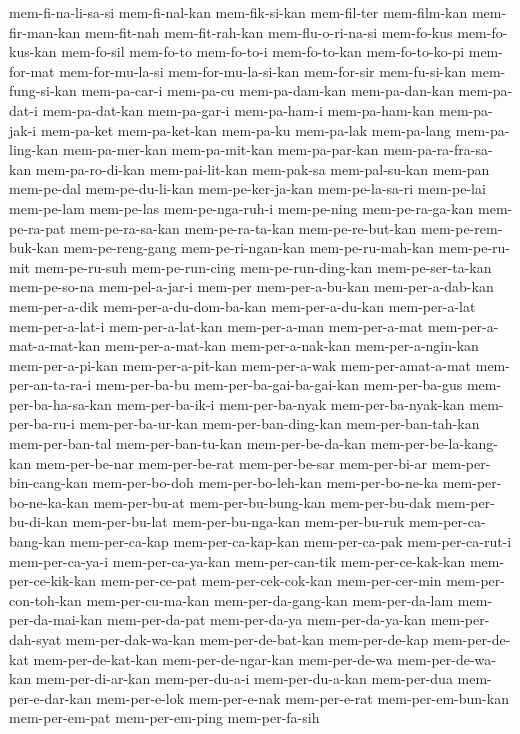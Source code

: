 {mem-fi-na-li-sa-si mem-fi-nal-kan mem-fik-si-kan mem-fil-ter mem-film-kan
mem-fir-man-kan mem-fit-nah mem-fit-rah-kan mem-flu-o-ri-na-si mem-fo-kus
mem-fo-kus-kan mem-fo-sil mem-fo-to mem-fo-to-i mem-fo-to-kan
mem-fo-to-ko-pi mem-for-mat mem-for-mu-la-si mem-for-mu-la-si-kan
mem-for-sir mem-fu-si-kan mem-fung-si-kan mem-pa-car-i mem-pa-cu
mem-pa-dam-kan mem-pa-dan-kan mem-pa-dat-i mem-pa-dat-kan mem-pa-gar-i
mem-pa-ham-i mem-pa-ham-kan mem-pa-jak-i mem-pa-ket mem-pa-ket-kan
mem-pa-ku mem-pa-lak mem-pa-lang mem-pa-ling-kan mem-pa-mer-kan
mem-pa-mit-kan mem-pa-par-kan mem-pa-ra-fra-sa-kan mem-pa-ro-di-kan
mem-pai-lit-kan mem-pak-sa mem-pal-su-kan mem-pan mem-pe-dal
mem-pe-du-li-kan mem-pe-ker-ja-kan mem-pe-la-sa-ri mem-pe-lai mem-pe-lam
mem-pe-las mem-pe-nga-ruh-i mem-pe-ning mem-pe-ra-ga-kan mem-pe-ra-pat
mem-pe-ra-sa-kan mem-pe-ra-ta-kan mem-pe-re-but-kan mem-pe-rem-buk-kan
mem-pe-reng-gang mem-pe-ri-ngan-kan mem-pe-ru-mah-kan mem-pe-ru-mit
mem-pe-ru-suh mem-pe-run-cing mem-pe-run-ding-kan mem-pe-ser-ta-kan
mem-pe-so-na mem-pel-a-jar-i mem-per mem-per-a-bu-kan mem-per-a-dab-kan
mem-per-a-dik mem-per-a-du-dom-ba-kan mem-per-a-du-kan mem-per-a-lat
mem-per-a-lat-i mem-per-a-lat-kan mem-per-a-man mem-per-a-mat
mem-per-a-mat-a-mat-kan mem-per-a-mat-kan mem-per-a-nak-kan
mem-per-a-ngin-kan mem-per-a-pi-kan mem-per-a-pit-kan mem-per-a-wak
mem-per-amat-a-mat mem-per-an-ta-ra-i mem-per-ba-bu
mem-per-ba-gai-ba-gai-kan mem-per-ba-gus mem-per-ba-ha-sa-kan
mem-per-ba-ik-i mem-per-ba-nyak mem-per-ba-nyak-kan mem-per-ba-ru-i
mem-per-ba-ur-kan mem-per-ban-ding-kan mem-per-ban-tah-kan mem-per-ban-tal
mem-per-ban-tu-kan mem-per-be-da-kan mem-per-be-la-kang-kan mem-per-be-nar
mem-per-be-rat mem-per-be-sar mem-per-bi-ar mem-per-bin-cang-kan
mem-per-bo-doh mem-per-bo-leh-kan mem-per-bo-ne-ka mem-per-bo-ne-ka-kan
mem-per-bu-at mem-per-bu-bung-kan mem-per-bu-dak mem-per-bu-di-kan
mem-per-bu-lat mem-per-bu-nga-kan mem-per-bu-ruk mem-per-ca-bang-kan
mem-per-ca-kap mem-per-ca-kap-kan mem-per-ca-pak mem-per-ca-rut-i
mem-per-ca-ya-i mem-per-ca-ya-kan mem-per-can-tik mem-per-ce-kak-kan
mem-per-ce-kik-kan mem-per-ce-pat mem-per-cek-cok-kan mem-per-cer-min
mem-per-con-toh-kan mem-per-cu-ma-kan mem-per-da-gang-kan mem-per-da-lam
mem-per-da-mai-kan mem-per-da-pat mem-per-da-ya mem-per-da-ya-kan
mem-per-dah-syat mem-per-dak-wa-kan mem-per-de-bat-kan mem-per-de-kap
mem-per-de-kat mem-per-de-kat-kan mem-per-de-ngar-kan mem-per-de-wa
mem-per-de-wa-kan mem-per-di-ar-kan mem-per-du-a-i mem-per-du-a-kan
mem-per-dua mem-per-e-dar-kan mem-per-e-lok mem-per-e-nak mem-per-e-rat
mem-per-em-bun-kan mem-per-em-pat mem-per-em-ping mem-per-fa-sih
}
